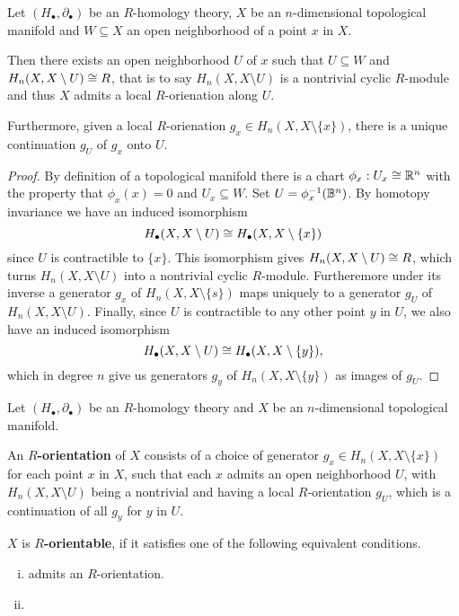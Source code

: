 	\begin{lemma}
		Let $(H_\bullet, \partial_\bullet)$ be an $R$-homology theory, $X$ be an $n$-dimensional topological manifold and $W \subseteq X$ an open neighborhood of a point $x$ in $X$.

		Then there exists an open neighborhood $U$ of $x$ such that $U \subseteq W$ and $H_n(X,X\setminus U) \cong R$, that is to say $H_n(X,X\setminus U)$ is a nontrivial cyclic $R$-module and thus $X$ admits a local $R$-orienation along $U$.

		Furthermore, given a local $R$-orienation $g_x \in H_n(X,X\setminus\{x\})$, there is a unique continuation $g_U$ of $g_x$ onto $U$.
	\end{lemma}
	\begin{proof}
		By definition of a topological manifold there is a chart $\phi_x: U_x \cong \mathbb{R}^n$ with the property that $\phi_x(x)=0$ and $U_x \subseteq W$. Set $U = \phi_x^{-1}(\mathbb{B}^n)$. By homotopy invariance we have an induced isomorphism
		\begin{equation*}
			H_\bullet(X,X\setminus U) \cong H_\bullet(X,X\setminus\{x\})
		\end{equation*}
		since $U$ is contractible to $\{x\}$. This isomorphism gives $H_n(X,X\setminus U) \cong R$, which turns $H_n(X,X\setminus U)$ into a nontrivial cyclic $R$-module. Furtheremore under its inverse a generator $g_x$ of $H_n(X,X\setminus\{s\})$ maps uniquely to a generator $g_U$ of $H_n(X,X\setminus U)$. Finally, since $U$ is contractible to any other point $y$ in $U$, we also have an induced isomorphism
		\begin{equation*}
			H_\bullet(X,X\setminus U) \cong H_\bullet(X,X\setminus \{y\}),
		\end{equation*}
		which in degree $n$ give us generators $g_y$ of $H_n(X,X\setminus \{y\})$ as images of $g_U$.
	\end{proof}

	\begin{definition}
		Let $(H_\bullet, \partial_\bullet)$ be an $R$-homology theory and $X$ be an $n$-dimensional topological manifold.

		An \textbf{$R$-orientation} of $X$ consists of a choice of generator $g_x \in H_n(X,X\setminus\{x\})$ for each point $x$ in $X$, such that each $x$ admits an open neighborhood $U$, with $H_n(X,X\setminus U)$ being a nontrivial  and having a local $R$-orientation $g_U$, which is a continuation of all $g_y$ for $y$ in $U$.

		$X$ is \textbf{$R$-orientable}, if it satisfies one of the following equivalent conditions.
		\begin{enumerate}[(i)]
			\item{
				admits  an $R$-orientation.
			}
			\item{
			}
		\end{enumerate}
	\end{definition}


